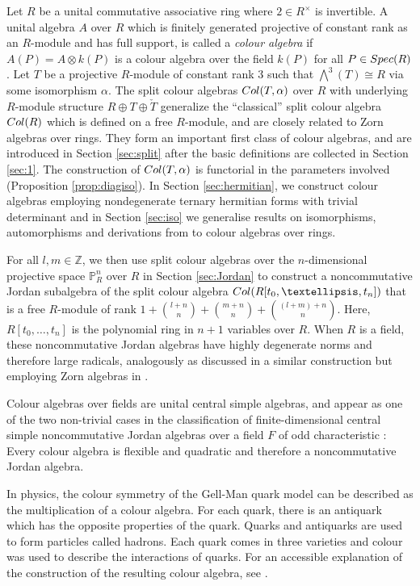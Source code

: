 \documentclass[10pt]{amsart}
\theoremstyle{plain}
\theoremstyle{definition}
\begin{document}
Let $R$ be a unital commutative associative ring where $2\in R^\times$ is invertible.  A unital algebra $A$ over $R$ which is  finitely generated projective  of constant rank as an $R$-module and has full support, is called a \emph{colour algebra} if $A(P)=A\otimes k(P)$ is a colour algebra over the field $k(P)$ for all $P \in {\rm Spec}(R)$.
Let $T$ be a projective $R$-module of constant rank 3 such that $\bigwedge^3 (T)\cong R $ via some isomorphism $\alpha$.
The split colour algebras ${\rm Col}( T,\alpha)$ over $R$ with underlying $R$-module structure $R\oplus T\oplus \check{T}$ generalize the ``classical'' split colour algebra ${\rm Col}(R)$ which is defined on a free $R$-module, and are closely related to Zorn algebras over rings. They
  form an important first class of colour algebras, and are introduced in Section \ref{sec:split} after the basic definitions are collected in Section \ref{sec:1}. The construction of ${\rm Col}( T,\alpha)$ is functorial in the parameters involved (Proposition \ref{prop:diagiso}).
 In Section \ref{sec:hermitian}, we construct colour algebras employing nondegenerate ternary hermitian forms with trivial determinant and in Section \ref{sec:iso} we generalise results on isomorphisms, automorphisms and derivations from \cite{EM} to colour algebras over rings.

For all $l,m\in \mathbb{Z}$, we then use split colour algebras over the $n$-dimensional projective space $\mathbb{P}_R^n$ over $R$ in Section \ref{sec:Jordan} to construct a noncommutative Jordan subalgebra of the split colour algebra $ {\rm Col}(R[t_0,\dots,t_n])$ that is  a free $R$-module of rank $1+\binom{l+n}{n}+\binom{m+n}{n}+\binom{(l+m)+n}{n}$.
Here,
 $R[t_0,\dots,t_n]$ is the polynomial ring in $n+1$ variables over $R$. When $R$ is a field, these noncommutative Jordan algebras have highly degenerate norms and therefore large radicals, analogously as discussed in a similar construction but employing Zorn algebras in \cite[3.8]{P2}.

Colour algebras over fields are unital central simple algebras, and appear as one of the two non-trivial cases in the classification of finite-dimensional central simple noncommutative Jordan algebras over a field $F$ of odd characteristic \cite{Sch3}:  Every colour algebra is flexible and quadratic and therefore a noncommutative Jordan algebra.

In physics, the colour symmetry of the Gell-Man quark model can be described as the multiplication of a colour algebra. For each quark, there is an antiquark which has the opposite properties of the quark. Quarks and antiquarks are used to form particles called hadrons. Each quark comes in three varieties and colour was used to describe the interactions of quarks. For an accessible explanation of the construction of the resulting colour algebra, see \cite{W}.
\end{document}
